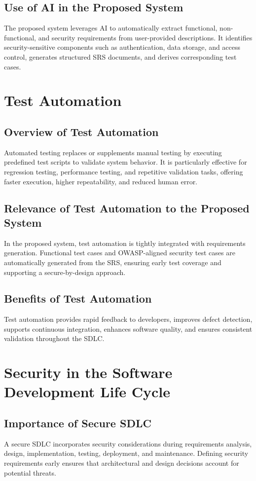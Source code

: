 \documentclass[12pt,a4paper,oneside]{report}
\begin{document}
\subsection{Use of AI in the Proposed System}
The proposed system leverages AI to automatically extract functional, non-functional, and security requirements from user-provided descriptions. It identifies security-sensitive components such as authentication, data storage, and access control, generates structured SRS documents, and derives corresponding test cases.

\section{Test Automation}
\subsection{Overview of Test Automation}
Automated testing replaces or supplements manual testing by executing predefined test scripts to validate system behavior. It is particularly effective for regression testing, performance testing, and repetitive validation tasks, offering faster execution, higher repeatability, and reduced human error.

\subsection{Relevance of Test Automation to the Proposed System}
In the proposed system, test automation is tightly integrated with requirements generation. Functional test cases and OWASP-aligned security test cases are automatically generated from the SRS, ensuring early test coverage and supporting a secure-by-design approach.

\subsection{Benefits of Test Automation}
Test automation provides rapid feedback to developers, improves defect detection, supports continuous integration, enhances software quality, and ensures consistent validation throughout the SDLC.

\section{Security in the Software Development Life Cycle}
\subsection{Importance of Secure SDLC}
A secure SDLC incorporates security considerations during requirements analysis, design, implementation, testing, deployment, and maintenance. Defining security requirements early ensures that architectural and design decisions account for potential threats.
\end{document}

